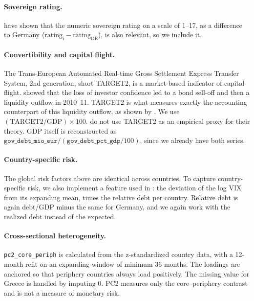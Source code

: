 \paragraph{Sovereign rating.}
\textcite{afonso2012sovereign} have shown that the numeric sovereign rating on a
scale of 1--17, as a difference to Germany
($\text{rating}_i - \text{rating}_{\text{DE}}$), is also relevant, so we include
it.

\paragraph{Convertibility and capital flight.}
The Trans-European Automated Real-time Gross Settlement Express Transfer System,
2nd generation, short TARGET2, is a market-based indicator of capital flight.
\textcite{degrauweji2013} showed that the loss of investor confidence led to a
bond sell-off and then a liquidity outflow in 2010--11. TARGET2 is what measures
exactly the accounting counterpart of this liquidity outflow, as shown by
\textcite{sinnwollmershaeuser2012,krishnamurthy2018}. We use
$(\text{TARGET2}/\text{GDP})\times100$. \textcite{degrauweji2013} do not use
TARGET2 as an empirical proxy for their theory. GDP itself is reconstructed as
$\texttt{gov\_debt\_mio\_eur} / (\texttt{gov\_debt\_pct\_gdp}/100)$, since we
already have both series.

\paragraph{Country-specific risk.}
The global risk factors above are identical across countries. To capture
country-specific risk, we also implement a feature used in \textcite{afonso2015}:
the deviation of the log VIX from its expanding mean, times the relative debt per
country. Relative debt is again debt/GDP minus the same for Germany, and we again
work with the realized debt instead of the expected.

\paragraph{Cross-sectional heterogeneity.}
\texttt{pc2\_core\_periph} is calculated from the z-standardized country data,
with a 12-month refit on an expanding window of minimum 36 months. The loadings
are anchored so that periphery countries always load positively. The missing value
for Greece is handled by imputing 0. PC2 measures only the core--periphery
contrast and is not a measure of monetary risk.

